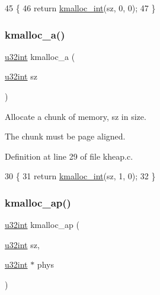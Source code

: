 \begin{DoxyCode}
45 \{
46     \textcolor{keywordflow}{return} \hyperlink{a00071_a8b976e8a7e805ef85fcfa68b9b9bbd63_a8b976e8a7e805ef85fcfa68b9b9bbd63}{kmalloc\_int}(sz, 0, 0);
47 \}
\end{DoxyCode}
\mbox{\label{a00074_a2f7fc26d2604f7bd8bd6d4fac5c98f16_a2f7fc26d2604f7bd8bd6d4fac5c98f16}} 
\subsubsection{\texorpdfstring{kmalloc\+\_\+a()}{kmalloc\_a()}}
{\footnotesize\ttfamily \hyperlink{a00125_a7ae3a26c17ddfe117c6291739780801d_a7ae3a26c17ddfe117c6291739780801d}{u32int} kmalloc\+\_\+a (\begin{DoxyParamCaption}\item[{\hyperlink{a00125_a7ae3a26c17ddfe117c6291739780801d_a7ae3a26c17ddfe117c6291739780801d}{u32int}}]{sz }\end{DoxyParamCaption})}



Allocate a chunk of memory, sz in size. 

The chunk must be page aligned. 

Definition at line 29 of file kheap.\+c.


\begin{DoxyCode}
30 \{
31     \textcolor{keywordflow}{return} \hyperlink{a00071_a8b976e8a7e805ef85fcfa68b9b9bbd63_a8b976e8a7e805ef85fcfa68b9b9bbd63}{kmalloc\_int}(sz, 1, 0);
32 \}
\end{DoxyCode}
\mbox{\label{a00074_ab4fd209369f6c18acead48b80e7f09c7_ab4fd209369f6c18acead48b80e7f09c7}} 
\subsubsection{\texorpdfstring{kmalloc\+\_\+ap()}{kmalloc\_ap()}}
{\footnotesize\ttfamily \hyperlink{a00125_a7ae3a26c17ddfe117c6291739780801d_a7ae3a26c17ddfe117c6291739780801d}{u32int} kmalloc\+\_\+ap (\begin{DoxyParamCaption}\item[{\hyperlink{a00125_a7ae3a26c17ddfe117c6291739780801d_a7ae3a26c17ddfe117c6291739780801d}{u32int}}]{sz,  }\item[{\hyperlink{a00125_a7ae3a26c17ddfe117c6291739780801d_a7ae3a26c17ddfe117c6291739780801d}{u32int} $\ast$}]{phys }\end{DoxyParamCaption})}



